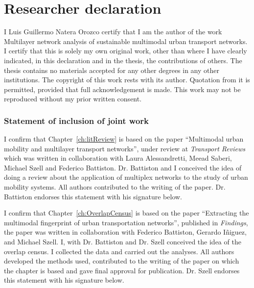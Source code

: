 \documentclass[a4paper,twoside,12pt]{book}
\begin{document}
\mbox{}

\pagestyle{empty}

\newpage

\chapter*{Researcher declaration}
I Luis Guillermo Natera Orozco certify that I am the author of the work Multilayer network analysis of sustainable multimodal urban transport networks. I certify that this is solely my own original work, other than where I have clearly indicated, in this declaration and in the thesis, the contributions of others. The thesis contains no materials accepted for any other degrees in any other institutions.  The copyright of this work rests with its author. Quotation from it is permitted, provided that full acknowledgement is made. This work may not be reproduced without my prior written consent.

\subsection*{Statement of inclusion of joint work}
I confirm that Chapter~\ref{ch:litReview} is based on the paper ``Multimodal urban mobility and multilayer transport networks'', under review at \textit{Transport Reviews} which was written in collaboration with Laura Alessandretti, Meead Saberi, Michael Szell and Federico Battiston. Dr. Battiston and I conceived the idea of doing a review about the application of multiplex networks to the study of urban mobility systems. All authors contributed to the writing of the paper. Dr. Battiston endorses this statement with his signature below.

\vspace{.2cm}

I confirm that Chapter~\ref{ch:OverlapCensus} is based on the paper ``Extracting the multimodal fingerprint of urban transportation networks'', published in \textit{Findings}, the paper was written in collaboration with Federico Battiston, Gerardo I\~niguez, and Michael Szell. I, with Dr. Battiston and Dr. Szell conceived the idea of the overlap census. I collected the data and carried out the analyses. All authors developed the methods used, contributed to the writing of the paper on which the chapter is based and gave final approval for publication. Dr. Szell endorses this statement with his signature below.

\vspace{.2cm}
\end{document}
